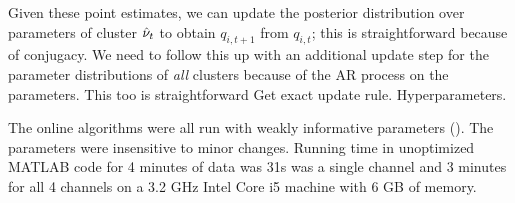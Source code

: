 Given these point estimates, we can update the posterior distribution over parameters of cluster $\hat{\nu}_t$ to obtain $q_{i,t+1}$ from $q_{i,t}$; this
is straightforward because of conjugacy. 
We need to follow this up with an additional update step for the parameter distributions of \emph{all} clusters because of the AR process on the parameters.
This too is straightforward {\color{red} Get exact update rule. Hyperparameters}.

The online algorithms were all run with weakly informative parameters (). The parameters were insensitive to minor changes.  Running time in unoptimized MATLAB code for 4 minutes of data was 31s was a single channel and 3 minutes for all 4 channels on a 3.2 GHz Intel Core i5 machine with 6 GB of memory.

